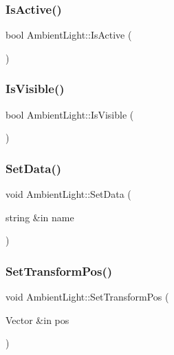 \subsubsection{\texorpdfstring{Is\+Active()}{IsActive()}}
{\footnotesize\ttfamily bool Ambient\+Light\+::\+Is\+Active (\begin{DoxyParamCaption}{ }\end{DoxyParamCaption})}

\hypertarget{class_ambient_light_a16bfc3c9bdb559895f1ed7d4bd047032}{}\label{class_ambient_light_a16bfc3c9bdb559895f1ed7d4bd047032} 
\subsubsection{\texorpdfstring{Is\+Visible()}{IsVisible()}}
{\footnotesize\ttfamily bool Ambient\+Light\+::\+Is\+Visible (\begin{DoxyParamCaption}{ }\end{DoxyParamCaption})}

\hypertarget{class_ambient_light_a82e62f3b145c061ee322643e5a6a9b2e}{}\label{class_ambient_light_a82e62f3b145c061ee322643e5a6a9b2e} 
\subsubsection{\texorpdfstring{Set\+Data()}{SetData()}}
{\footnotesize\ttfamily void Ambient\+Light\+::\+Set\+Data (\begin{DoxyParamCaption}\item[{string \&in}]{name }\end{DoxyParamCaption})}

\hypertarget{class_ambient_light_ab8a292194dff1d0c744c40a2c72d6704}{}\label{class_ambient_light_ab8a292194dff1d0c744c40a2c72d6704} 
\subsubsection{\texorpdfstring{Set\+Transform\+Pos()}{SetTransformPos()}}
{\footnotesize\ttfamily void Ambient\+Light\+::\+Set\+Transform\+Pos (\begin{DoxyParamCaption}\item[{Vector \&in}]{pos }\end{DoxyParamCaption})}

